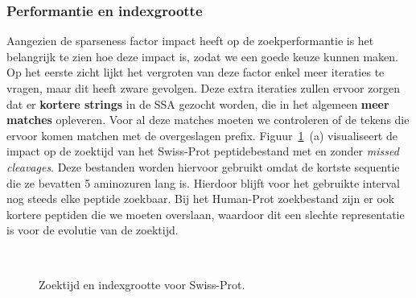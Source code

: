 \subsubsection{Performantie en indexgrootte}
Aangezien de sparseness factor impact heeft op de zoekperformantie is het belangrijk te zien hoe deze impact is, zodat we een goede keuze kunnen maken.
Op het eerste zicht lijkt het vergroten van deze factor enkel meer iteraties te vragen, maar dit heeft zware gevolgen.
Deze extra iteraties zullen ervoor zorgen dat er \textbf{kortere strings} in de SSA gezocht worden, die in het algemeen \textbf{meer matches} opleveren.
Voor al deze matches moeten we controleren of de tekens die ervoor komen matchen met de overgeslagen prefix.
Figuur~\ref{fig:search_sparseness}~(a) visualiseert de impact op de zoektijd van het Swiss-Prot peptidebestand met en zonder \textit{missed cleavages}.
Deze bestanden worden hiervoor gebruikt omdat de kortste sequentie die ze bevatten 5 aminozuren lang is.
Hierdoor blijft voor het gebruikte interval nog steeds elke peptide zoekbaar.
Bij het Human-Prot zoekbestand zijn er ook kortere peptiden die we moeten overslaan, waardoor dit een slechte representatie is voor de evolutie van de zoektijd.
\\
\begin{figure}[H]
    \centering
    \\[4ex] %

    \caption{Zoektijd en indexgrootte voor Swiss-Prot.}\label{fig:search_sparseness}
\end{figure}

